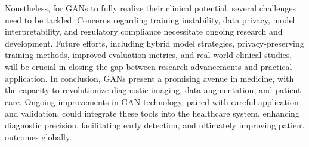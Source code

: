 \documentclass[12pt]{article}
\begin{document}
Nonetheless, for GANs to fully realize their clinical potential, several challenges need to be tackled. Concerns regarding training instability, data privacy, model interpretability, and regulatory compliance necessitate ongoing research and development. Future efforts, including hybrid model strategies, privacy-preserving training methods, improved evaluation metrics, and real-world clinical studies, will be crucial in closing the gap between research advancements and practical application.  In conclusion, GANs present a promising avenue in medicine, with the capacity to revolutionize diagnostic imaging, data augmentation, and patient care. Ongoing improvements in GAN technology, paired with careful application and validation, could integrate these tools into the healthcare system, enhancing diagnostic precision, facilitating early detection, and ultimately improving patient outcomes globally.



\end{document}
